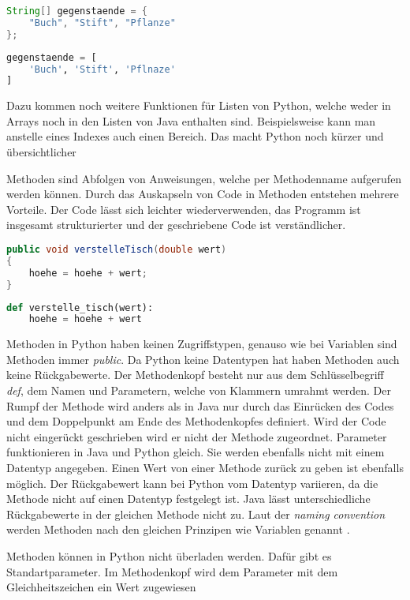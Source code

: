 \begin{lstlisting}[language=java,caption={Einfache Deklarierung eines Arrays in Java},captionpos=b,label={lst:java:ezarray},frame=none]
String[] gegenstaende = {
    "Buch", "Stift", "Pflanze"
};
\end{lstlisting}

\begin{lstlisting}[language=python,caption={Einfach Deklarierung eines Arrays in Python},captionpos=b,label={lst:python:ezarray},frame=none]
gegenstaende = [
    'Buch', 'Stift', 'Pflnaze'
]
\end{lstlisting}

Dazu kommen noch weitere Funktionen für Listen von Python, welche weder in Arrays noch in den Listen von Java enthalten sind. Beispielsweise kann man anstelle eines Indexes auch einen Bereich. Das macht Python noch kürzer und übersichtlicher\par
Methoden sind Abfolgen von Anweisungen, welche per Methodenname aufgerufen werden können. Durch das Auskapseln von Code in Methoden entstehen mehrere Vorteile. Der Code lässt sich leichter wiederverwenden, das Programm ist insgesamt strukturierter und der geschriebene Code ist verständlicher. \cite{Python3:Buch}\cite{Louis:2010}

\begin{lstlisting}[language=java,caption={Methoden in Java},captionpos=b,label={lst:java:methode},frame=none]
public void verstelleTisch(double wert)
{
    hoehe = hoehe + wert;
}
\end{lstlisting}

\begin{lstlisting}[language=python,caption={Methode in Python},captionpos=b,label={lst:python:methode},frame=none]
def verstelle_tisch(wert):
    hoehe = hoehe + wert
\end{lstlisting}

Methoden in Python haben keinen Zugriffstypen, genauso wie bei Variablen sind Methoden immer \textit{public}. Da Python keine Datentypen hat haben Methoden auch keine Rückgabewerte. Der Methodenkopf besteht nur aus dem Schlüsselbegriff \textit{def}, dem Namen und Parametern, welche von Klammern umrahmt werden. Der Rumpf der Methode wird anders als in Java nur durch das Einrücken des Codes und dem Doppelpunkt am Ende des Methodenkopfes definiert. Wird der Code nicht eingerückt geschrieben wird er nicht der Methode zugeordnet. Parameter funktionieren in Java und Python gleich. Sie werden ebenfalls nicht mit einem Datentyp angegeben. Einen Wert von einer Methode zurück zu geben ist ebenfalls möglich. Der Rückgabewert kann bei Python vom Datentyp variieren, da die Methode nicht auf einen Datentyp festgelegt ist. Java lässt unterschiedliche Rückgabewerte in der gleichen Methode nicht zu. Laut der \textit{naming convention} werden Methoden nach den gleichen Prinzipen wie Variablen genannt \cite{Ims:h-s}\cite{Microsoft:CapCon}. \cite{Python3:Buch}\cite{Louis:2010}\par
Methoden können in Python nicht überladen werden. Dafür gibt es Standartparameter. Im Methodenkopf wird dem Parameter mit dem Gleichheitszeichen ein Wert zugewiesen

